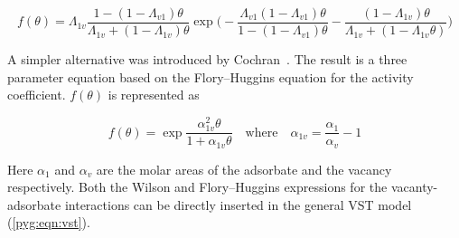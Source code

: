 \begin{equation}\label{pyg:eqn:wvst}
	f(\theta) = \Lambda_{1v}
	\frac{1-(1-\Lambda_{v1})\theta}{\Lambda_{1v}+(1-\Lambda_{1v})\theta}
	\exp{\bigg(
		-\frac{\Lambda_{v1}(1-\Lambda_{v1})\theta}{1-(1-\Lambda_{v1})\theta}
		-\frac{(1 - \Lambda_{1v})\theta}{\Lambda_{1v} +
			(1-\Lambda_{1v}\theta)} \bigg)}
\end{equation}

A simpler alternative was introduced by 
Cochran~\cite{cochranVacancySolutionTheory1985}. The result is a 
three parameter equation based on the Flory–Huggins equation for the 
activity coefficient. \(f(\theta)\) is represented as 

\begin{equation}\label{pyg:eqn:fhvst}
	f(\theta) = 
	\exp{\frac{\alpha^2_{1v}\theta}{1+\alpha_{1v}\theta}}
	\quad \text{where} \quad
	\alpha_{1v} = \frac{\alpha_{1}}{\alpha_{v}} - 1
\end{equation}

Here \(\alpha_{1}\) and \(\alpha_{v}\) are the molar areas of the
adsorbate and the vacancy respectively.
Both the Wilson and Flory–Huggins expressions for the vacanty-adsorbate
interactions can be directly inserted in the general VST model
(\autoref{pyg:eqn:vst}).
